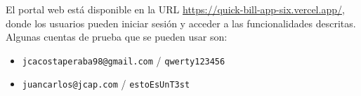 \begin{large}
\noindent El portal web está disponible en la URL \url{https://quick-bill-app-six.vercel.app/}, donde los usuarios pueden iniciar sesión y acceder a las funcionalidades descritas. Algunas cuentas de prueba que se pueden usar son:
\begin{itemize}
	\item \texttt{jcacostaperaba98@gmail.com} / \texttt{qwerty123456}
	\item \texttt{juancarlos@jcap.com} / \texttt{estoEsUnT3st}
\end{itemize}

\end{large}
